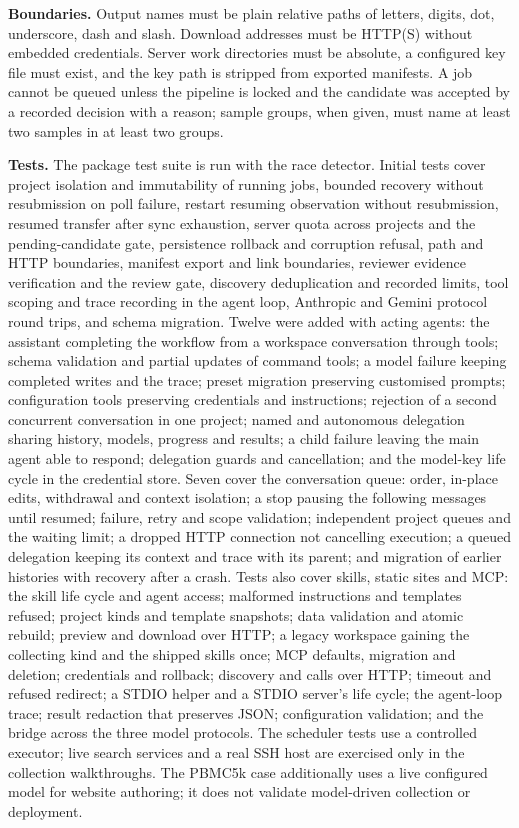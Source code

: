 \documentclass[11pt,a4paper]{article}
\begin{document}
\textbf{Boundaries.} Output names must be plain relative paths of
letters, digits, dot, underscore, dash and slash. Download addresses
must be HTTP(S) without embedded credentials. Server work directories
must be absolute, a configured key file must exist, and the key path is
stripped from exported manifests. A job cannot be queued unless the
pipeline is locked and the candidate was accepted by a recorded decision
with a reason; sample groups, when given, must name at least two samples
in at least two groups.

\textbf{Tests.} The package test suite is run with the race detector. Initial tests cover project isolation and
immutability of running jobs, bounded recovery without resubmission on
poll failure, restart resuming observation without resubmission, resumed
transfer after sync exhaustion, server quota across projects and the
pending-candidate gate, persistence rollback and corruption refusal,
path and HTTP boundaries, manifest export and link boundaries, reviewer
evidence verification and the review gate, discovery deduplication and
recorded limits, tool scoping and trace recording in the agent loop,
Anthropic and Gemini protocol round trips, and schema migration. Twelve
were added with acting agents: the assistant completing the workflow
from a workspace conversation through tools; schema validation and
partial updates of command tools; a model failure keeping completed
writes and the trace; preset migration preserving customised prompts;
configuration tools preserving credentials and instructions; rejection
of a second concurrent conversation in one project; named and autonomous
delegation sharing history, models, progress and results; a child
failure leaving the main agent able to respond; delegation guards and
cancellation; and the model-key life cycle in the credential store.
Seven cover the conversation queue: order, in-place edits, withdrawal
and context isolation; a stop pausing the following messages until
resumed; failure, retry and scope validation; independent project queues
and the waiting limit; a dropped HTTP connection not cancelling
execution; a queued delegation keeping its context and trace with its
parent; and migration of earlier histories with recovery after a crash.
Tests also cover skills, static sites and MCP: the skill life cycle and
agent access; malformed instructions and templates refused; project
kinds and template snapshots; data validation and atomic rebuild;
preview and download over HTTP; a legacy workspace gaining the
collecting kind and the shipped skills once; MCP defaults, migration and
deletion; credentials and rollback; discovery and calls over HTTP;
timeout and refused redirect; a STDIO helper and a STDIO server's life
cycle; the agent-loop trace; result redaction that preserves JSON;
configuration validation; and the bridge across the three model
protocols. The scheduler tests use a controlled executor; live search services and
a real SSH host are exercised only in the collection walkthroughs. The
PBMC5k case additionally uses a live configured model for website
authoring; it does not validate model-driven collection or deployment.
\end{document}
